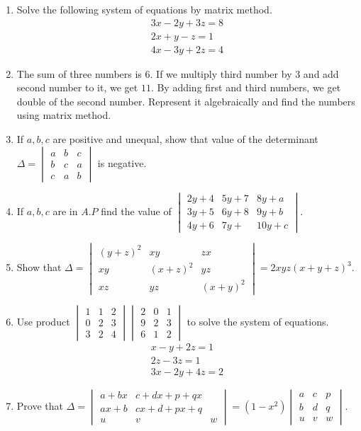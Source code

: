 \documentclass{article}
\theoremstyle{remark}
\begin{document}
\begin{enumerate}
\item Solve the following system of equations by matrix method.
\begin{align}
3x-2y+3z=8\\ 2x+y-z=1\\ 4x-3y+2z=4
\end{align}
\item The sum of three numbers is $6$. If we multiply third number by $3$ and add second number to it, we get $11$. By adding first and third numbers, we get double of the second number. Represent it algebraically and find the numbers using matrix method.
\item If $a, b, c$ are positive and unequal, show that value of the determinant $\Delta=\begin{vmatrix}a&b&c \\b&c&a \\c&a&b \end{vmatrix}$ is negative.
\item If $a, b, c$ are in $A.P$ find the value of $\begin{vmatrix}2y+4&5y+7&8y+a \\3y+5&6y+8&9y+b \\ 4y+6&7y+&10y+c\end{vmatrix}$.
\item Show that $\Delta=\begin{vmatrix}(y+z)^2&xy&zx \\ xy&(x+z)^2&yz\\ xz&yz&(x+y)^2 \end{vmatrix} = 2xyz(x+y+z)^3$.
\item Use product $\begin{vmatrix}1&1&2 \\0&2&3 \\3&2&4 \end{vmatrix} \begin{vmatrix}2&0&1 \\ 9&2&3 \\6&1&2 \end {vmatrix}$ to solve the system of equations.
\begin{align}
x-y+2z=1\\ 2z-3z=1\\ 3x-2y+4z=2
\end{align}
\item Prove that $\Delta = \begin{vmatrix}a+bx&c+dx+p+qx \\ ax+b&cx+d+px+q \\ u&v&w \end{vmatrix} = (1-x^2) \begin{vmatrix}a&c&p \\b&d&q \\u&v&w \end{vmatrix}$.
\end{enumerate}
\end{document}
